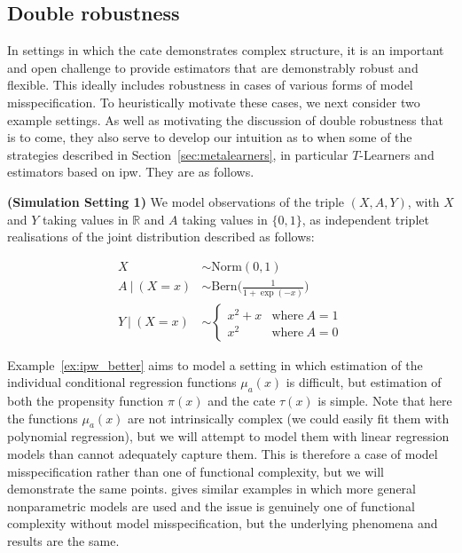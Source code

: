\documentclass[../thesis.tex]{subfiles}
\begin{document}
\subsection{Double robustness} \label{sec:doublerobustness}
In settings in which the \gls{cate} demonstrates complex structure, it is an important and open challenge to provide estimators that are demonstrably robust and flexible. This ideally includes robustness in cases of various forms of model misspecification. To heuristically motivate these cases, we next consider two example settings. As well as motivating the discussion of double robustness that is to come, they also serve to develop our intuition as to when some of the strategies described in Section~\ref{sec:metalearners}, in particular $T$-Learners and estimators based on \gls{ipw}. They are as follows.

\begin{example}{\textbf{(Simulation Setting 1)}} \label{ex:ipw_better}
We model observations of the triple $(X, A, Y)$, with $X$ and $Y$ taking values in $\mathbb{R}$ and $A$ taking values in $\{0,1\}$, as independent triplet realisations of the joint distribution described as follows:

\begin{align*}
X & \sim \mathrm{Norm}(0, 1) \\    
A \ | \ (X = x) & \sim \mathrm{Bern}\Big(\frac{1}{1 + \exp(-x)}\Big) \\ 
Y \ | \ (X = x) & \sim \begin{cases}
      x^2 + x & \text{where} \ A = 1\\
      x^2 & \text{where} \ A = 0
    \end{cases}
\end{align*}
\end{example}

Example~\ref{ex:ipw_better} aims to model a setting in which estimation of the individual conditional regression functions $\mu_a(x)$ is difficult, but estimation of both the propensity function $\pi(x)$ and the \gls{cate} $\tau(x)$ is simple. Note that here the functions $\mu_a(x)$ are not intrinsically complex (we could easily fit them with polynomial regression), but we will attempt to model them with linear regression models than cannot adequately capture them. This is therefore a case of model misspecification rather than one of functional complexity, but we will demonstrate the same points. \citet{kennedy_towards_2022} gives similar examples in which more general nonparametric models are used and the issue is genuinely one of functional complexity without model misspecification, but the underlying phenomena and results are the same.
\end{document}
